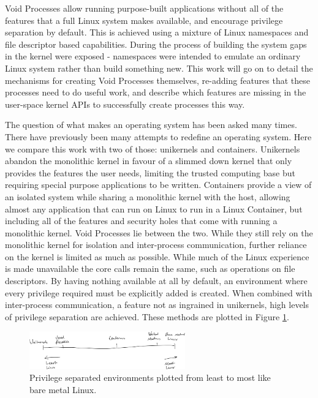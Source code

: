 \documentclass[12pt,a4paper,twoside]{report}
\begin{document}
\setcounter{page}{1}

Void Processes allow running purpose-built applications without all of the features that a full Linux system makes available, and encourage privilege separation by default. This is achieved using a mixture of Linux namespaces and file descriptor based capabilities. During the process of building the system gaps in the kernel were exposed - namespaces were intended to emulate an ordinary Linux system rather than build something new. This work will go on to detail the mechanisms for creating Void Processes themselves, re-adding features that these processes need to do useful work, and describe which features are missing in the user-space kernel APIs to successfully create processes this way.

The question of what makes an operating system has been asked many times. There have previously been many attempts to redefine an operating system. Here we compare this work with two of those: unikernels and containers. Unikernels abandon the monolithic kernel in favour of a slimmed down kernel that only provides the features the user needs, limiting the trusted computing base but requiring special purpose applications to be written. Containers provide a view of an isolated system while sharing a monolithic kernel with the host, allowing almost any application that can run on Linux to run in a Linux Container, but including all of the features and security holes that come with running a monolithic kernel. Void Processes lie between the two. While they still rely on the monolithic kernel for isolation and inter-process communication, further reliance on the kernel is limited as much as possible. While much of the Linux experience is made unavailable the core calls remain the same, such as operations on file descriptors. By having nothing available at all by default, an environment where every privilege required must be explicitly added is created. When combined with inter-process communication, a feature not as ingrained in unikernels, high levels of privilege separation are achieved. These methods are plotted in Figure \ref{fig:least-to-most-linux}.

\begin{figure}[h]
    \centering
    \includegraphics[width=0.6\textwidth]{figures/least-most-linux.png}
    \caption{Privilege separated environments plotted from least to most like bare metal Linux.}
    \label{fig:least-to-most-linux}
\end{figure}
\end{document}
